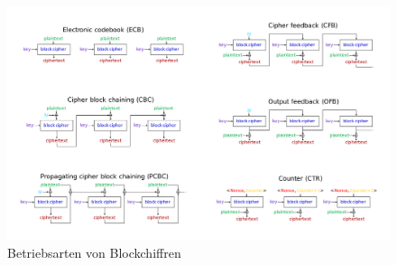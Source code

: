 \begin{figure}
  \centering
  \includegraphics[width=.6\textwidth]{res/betriebsarten.png}
  \caption{Betriebsarten von Blockchiffren}
  \label{fig:betriebsarten}
\end{figure}
